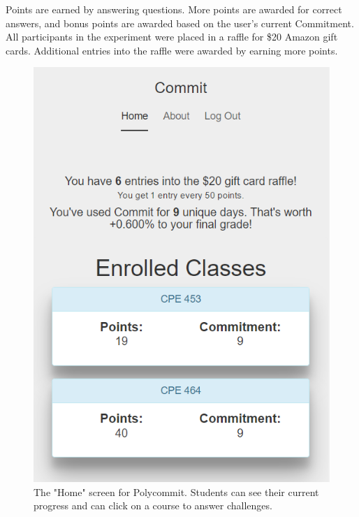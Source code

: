 \par Points are earned by answering questions. More points are awarded for correct answers, and bonus points are awarded based on the user's current Commitment. All participants in the experiment were placed in a raffle for \$20 Amazon gift cards. Additional entries into the raffle were awarded by earning more points.

\begin{figure}[h]
	\includegraphics{figures/polycommit-screen}
	\caption{The "Home" screen for Polycommit. Students can see their current progress and can click on a course to answer challenges.}
	\label{fig:polycommit1}
\end{figure}

